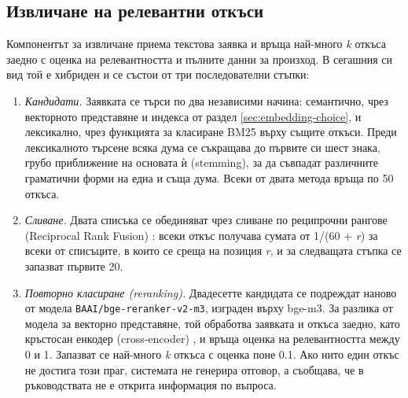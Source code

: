 \documentclass[12pt,a4paper]{article}
\begin{document}
\subsection{Извличане на релевантни откъси}
\label{sec:retrieval-component}
Компонентът за извличане приема текстова заявка и връща най-много \textit{k} откъса заедно с оценка на релевантността и пълните данни за произход. В сегашния си вид той е хибриден и се състои от три последователни стъпки:
\begin{enumerate}[noitemsep]
\item \emph{Кандидати.} Заявката се търси по два независими начина: семантично, чрез векторното представяне и индекса от раздел \ref{sec:embedding-choice}, и лексикално, чрез функцията за класиране BM25 \cite{robertson2009bm25} върху същите откъси. Преди лексикалното търсене всяка дума се съкращава до първите си шест знака, грубо приближение на основата ѝ (stemming), за да съвпадат различните граматични форми на една и съща дума. Всеки от двата метода връща по 50 откъса.
\item \emph{Сливане.} Двата списъка се обединяват чрез сливане по реципрочни рангове (Reciprocal Rank Fusion) \cite{cormack2009rrf}: всеки откъс получава сумата от 1/(60 + \textit{r}) за всеки от списъците, в които се среща на позиция \textit{r}, и за следващата стъпка се запазват първите 20.
\item \emph{Повторно класиране (reranking).} Двадесетте кандидата се подреждат наново от модела \nolinkurl{BAAI/bge-reranker-v2-m3}, изграден върху bge-m3. За разлика от модела за векторно представяне, той обработва заявката и откъса заедно, като кръстосан енкодер (cross-encoder) \cite{nogueira2019passage}, и връща оценка на релевантността между 0 и 1. Запазват се най-много \textit{k} откъса с оценка поне 0.1. Ако нито един откъс не достига този праг, системата не генерира отговор, а съобщава, че в ръководствата не е открита информация по въпроса.
\end{enumerate}
\end{document}
